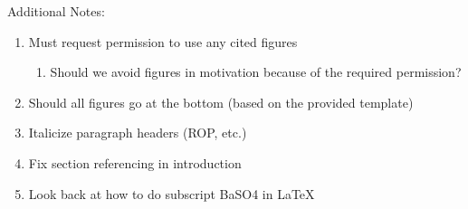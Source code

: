 \begin{tcolorbox}[colback=yellow, colframe=yellow, sharp corners, boxrule=0pt]
        Additional Notes:
        \begin{enumerate}[label=\arabic*.]
                \item Must request permission to use any cited figures
                      \begin{enumerate}[label=\theenumi.\arabic*.]
                              \item Should we avoid figures in motivation because of the required permission?
                      \end{enumerate}
                      \item Should all figures go at the bottom (based on the provided template)
                      \item Italicize paragraph headers (ROP, etc.)
                      \item Fix section referencing in introduction
                      \item Look back at how to do subscript BaSO4 in LaTeX
        \end{enumerate}

\end{tcolorbox}